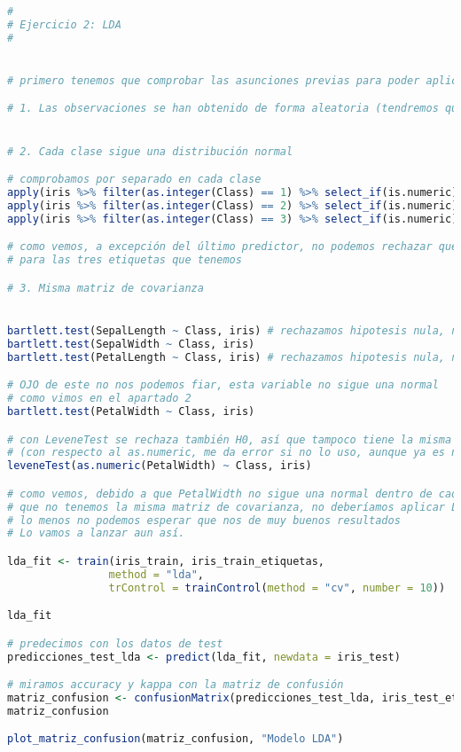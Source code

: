 \begin{lstlisting}[language=R]
#
# Ejercicio 2: LDA
#


# primero tenemos que comprobar las asunciones previas para poder aplicar LDA

# 1. Las observaciones se han obtenido de forma aleatoria (tendremos que suponer que así ha sido)


# 2. Cada clase sigue una distribución normal

# comprobamos por separado en cada clase
apply(iris %>% filter(as.integer(Class) == 1) %>% select_if(is.numeric), 2, shapiro.test)
apply(iris %>% filter(as.integer(Class) == 2) %>% select_if(is.numeric), 2, shapiro.test)
apply(iris %>% filter(as.integer(Class) == 3) %>% select_if(is.numeric), 2, shapiro.test)

# como vemos, a excepción del último predictor, no podemos rechazar que siga una distribución normal
# para las tres etiquetas que tenemos

# 3. Misma matriz de covarianza


bartlett.test(SepalLength ~ Class, iris) # rechazamos hipotesis nula, no sigue la misma covarianza
bartlett.test(SepalWidth ~ Class, iris)
bartlett.test(PetalLength ~ Class, iris) # rechazamos hipotesis nula, no sigue la misma covarianza

# OJO de este no nos podemos fiar, esta variable no sigue una normal
# como vimos en el apartado 2
bartlett.test(PetalWidth ~ Class, iris)

# con LeveneTest se rechaza también H0, así que tampoco tiene la misma covarianza
# (con respecto al as.numeric, me da error si no lo uso, aunque ya es numerico, no se por que)
leveneTest(as.numeric(PetalWidth) ~ Class, iris)

# como vemos, debido a que PetalWidth no sigue una normal dentro de cada clase, y
# que no tenemos la misma matriz de covarianza, no deberíamos aplicar LDA, o por
# lo menos no podemos esperar que nos de muy buenos resultados
# Lo vamos a lanzar aun así.

lda_fit <- train(iris_train, iris_train_etiquetas,
				method = "lda",
				trControl = trainControl(method = "cv", number = 10))

lda_fit

# predecimos con los datos de test
predicciones_test_lda <- predict(lda_fit, newdata = iris_test)

# miramos accuracy y kappa con la matriz de confusión
matriz_confusion <- confusionMatrix(predicciones_test_lda, iris_test_etiquetas)
matriz_confusion

plot_matriz_confusion(matriz_confusion, "Modelo LDA")


\end{lstlisting}
